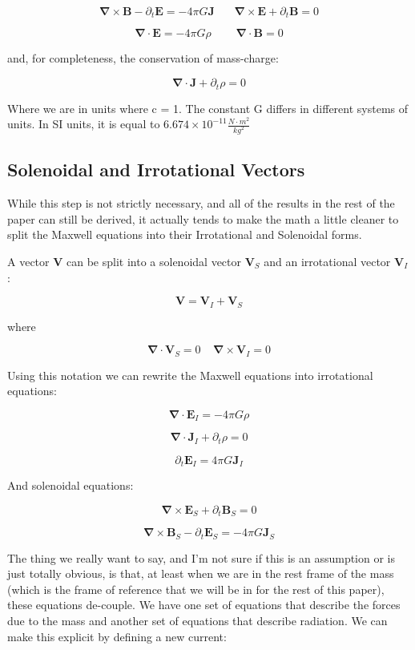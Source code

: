 \documentclass {article}
\renewcommand\vec{\mathbf}
\let\OldS\nabla
\renewcommand{\nabla}{\boldsymbol{\OldS}}
\begin{document}
$$\nabla \times \vec B  - \partial_t \vec E  = -4 \pi G \vec J ~~~~~~~~ \nabla \times \vec E + \partial_t \vec B = 0    $$

$$\nabla \cdot \vec E = -4 \pi G \rho ~~~~~~~~~~ \nabla \cdot \vec B = 0   $$

and, for completeness, the conservation of mass-charge:

$$\nabla \cdot \vec J + \partial_t \rho = 0 $$

Where we are in units where c = 1. The constant G differs in different systems of units. In SI units, it is equal to $6.674 \times 10^{-11} \frac {N \cdot m^2}{kg^2}$ 

\newpage 
\subsection{Solenoidal and Irrotational Vectors}
While this step is not strictly necessary, and all of the results in the rest of the paper can still be derived, it actually tends to make the math a little cleaner to split the Maxwell equations into their Irrotational and Solenoidal forms.

A vector $\vec V$ can be split into a solenoidal vector $\vec V_S$ and an irrotational vector $\vec V_I$:

$$\vec V = \vec V_I + \vec V_S $$

where

$$\nabla \cdot \vec V_S = 0 ~~~~~ \nabla \times \vec V_I = 0 $$

Using this notation we can rewrite the Maxwell equations into irrotational equations:

$$\nabla \cdot \vec E_I = -4 \pi G  \rho$$

$$\nabla \cdot \vec J_I + \partial_t \rho = 0 $$

$$ \partial_t \vec E_I = 4 \pi G \vec J_I $$

And solenoidal equations:

$$\nabla \times \vec E_S + \partial_t \vec B_S = 0 $$

$$\nabla \times \vec B_S - \partial_t \vec E_S =  - 4 \pi G \vec J_S$$

The thing we really want to say, and I'm not sure if this is an assumption or is just totally obvious, is that, at least when we are in the rest frame of the mass (which is the frame of reference that we will be in for the rest of this paper), these equations de-couple. We have one set of equations that describe the forces due to the mass and another set of equations that describe radiation. We can make this explicit by defining a new current:
\end{document}
